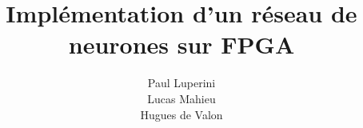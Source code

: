 \documentclass[A4]{article}
\title{Implémentation d'un réseau de neurones sur FPGA}
\author{Paul Luperini\\ Lucas Mahieu\\Hugues de Valon}
\begin{document}
\maketitle
   
   
\pagebreak
\tableofcontents

\pagebreak

\end{document}
